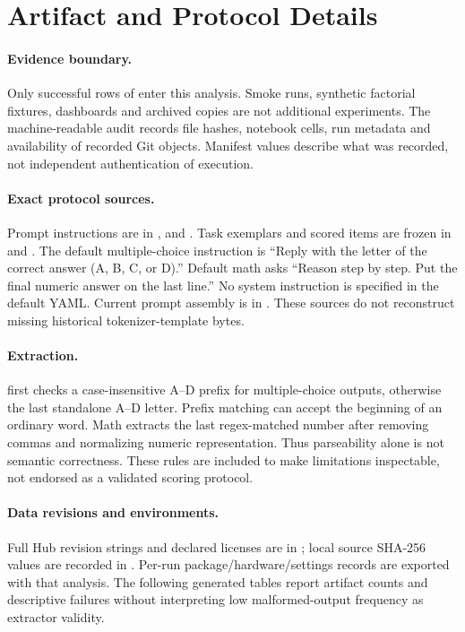 \section{Artifact and Protocol Details}
\label{sec:appendix}
\paragraph{Evidence boundary.}
Only successful rows of  enter this analysis. Smoke runs, synthetic factorial fixtures, dashboards and archived copies are not additional experiments. The machine-readable audit records file hashes, notebook cells, run metadata and availability of recorded Git objects. Manifest values describe what was recorded, not independent authentication of execution.

\paragraph{Exact protocol sources.}
Prompt instructions are in ,  and . Task exemplars and scored items are frozen in  and . The default multiple-choice instruction is ``Reply with the letter of the correct answer (A, B, C, or D).'' Default math asks ``Reason step by step. Put the final numeric answer on the last line.'' No system instruction is specified in the default YAML. Current prompt assembly is in . These sources do not reconstruct missing historical tokenizer-template bytes.

\paragraph{Extraction.}
 first checks a case-insensitive A--D prefix for multiple-choice outputs, otherwise the last standalone A--D letter. Prefix matching can accept the beginning of an ordinary word. Math extracts the last regex-matched number after removing commas and normalizing numeric representation. Thus parseability alone is not semantic correctness. These rules are included to make limitations inspectable, not endorsed as a validated scoring protocol.

\paragraph{Data revisions and environments.}
Full Hub revision strings and declared licenses are in ; local source SHA-256 values are recorded in . Per-run package/hardware/settings records are exported with that analysis. The following generated tables report artifact counts and descriptive failures without interpreting low malformed-output frequency as extractor validity.


